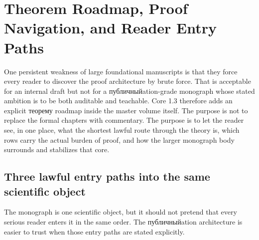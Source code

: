 \section{Theorem Roadmap, Proof Navigation, and Reader Entry Paths}
\label{sec:oc13-theorem-roadmap}

One persistent weakness of large foundational manuscripts is that they force every reader to
discover the proof architecture by brute force. That is acceptable for an internal draft but not
for a публичныйation-grade monograph whose stated ambition is to be both auditable and teachable.
Core 1.3 therefore adds an explicit теорему roadmap inside the master volume itself. The purpose
is not to replace the formal chapters with commentary. The purpose is to let the reader see, in
one place, what the shortest lawful route through the theory is, which rows carry the actual
burden of proof, and how the larger monograph body surrounds and stabilizes that core.

\subsection{Three lawful entry paths into the same scientific object}

The monograph is one scientific object, but it should not pretend that every serious reader
enters it in the same order. The публичныйation architecture is easier to trust when those entry
paths are stated explicitly.

